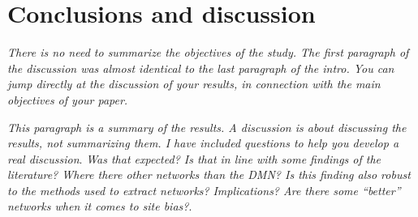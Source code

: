 \documentclass[authoryear]{elsarticle}
\begin{document}

\section{Conclusions and discussion}

\emph{There is no need to summarize the objectives of the study. The first paragraph of the discussion was almost identical to the last paragraph of the intro. You can jump directly at the discussion of your results, in connection with the main objectives of your paper.} 

\emph{This paragraph is a summary of the results. A discussion is about discussing the results, not summarizing them. I have included questions to help you develop a real discussion}.
\emph{Was that expected? Is that in line with some findings of the literature? Where there other networks than the DMN? Is this finding also robust to the methods used to extract networks?}
\emph{Implications? Are there some ``better'' networks when it comes to site bias?}. 
\end{document}
